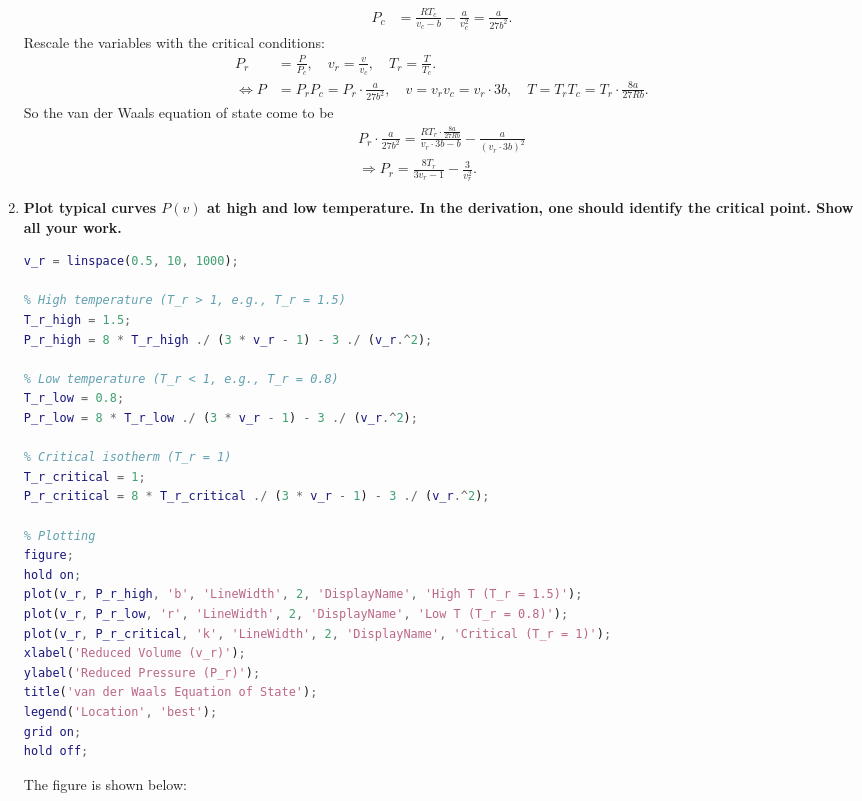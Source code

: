 \documentclass[../../main.tex]{subfiles}
\begin{document}
\begin{enumerate}
\begin{align*}
      P_{c} &= \frac{RT_{c}}{v_{c}-b} - \frac{a}{v_{c}^{2}} = \frac{a}{27b^{2}}.
    \end{align*}
    Rescale the variables with the critical conditions:
    \begin{align*}
      P_{r} &= \frac{P}{P_{c}},\quad v_{r} = \frac{v}{v_{c}},\quad T_{r} = \frac{T}{T_{c}}.\\
      \Leftrightarrow P &= P_{r}P_{c} = P_{r}\cdot\frac{a}{27b^{2}},\quad v = v_{r}v_{c} = v_{r}\cdot 3b,\quad T = T_{r}T_{c} = T_{r}\cdot\frac{8a}{27Rb}.
    \end{align*}
    So the van der Waals equation of state come to be
    \begin{align*}
      P_{r}\cdot \frac{a}{27b^{2}} = \frac{RT_{r}\cdot\frac{8a}{27Rb}}{v_{r}\cdot 3b - b} - \frac{a}{(v_{r}\cdot 3b)^{2}}\\
      \Rightarrow P_{r} = \frac{8T_{r}}{3v_{r}-1} - \frac{3}{v_{r}^{2}}.
    \end{align*}

    \item \textbf{Plot typical curves $P(v)$ at high and low temperature. In the derivation, one should identify the critical point. Show all your work.}
    \begin{lstlisting}[language=matlab]
% Define the reduced volume range
v_r = linspace(0.5, 10, 1000);

% High temperature (T_r > 1, e.g., T_r = 1.5)
T_r_high = 1.5;
P_r_high = 8 * T_r_high ./ (3 * v_r - 1) - 3 ./ (v_r.^2);

% Low temperature (T_r < 1, e.g., T_r = 0.8)
T_r_low = 0.8;
P_r_low = 8 * T_r_low ./ (3 * v_r - 1) - 3 ./ (v_r.^2);

% Critical isotherm (T_r = 1)
T_r_critical = 1;
P_r_critical = 8 * T_r_critical ./ (3 * v_r - 1) - 3 ./ (v_r.^2);

% Plotting
figure;
hold on;
plot(v_r, P_r_high, 'b', 'LineWidth', 2, 'DisplayName', 'High T (T_r = 1.5)');
plot(v_r, P_r_low, 'r', 'LineWidth', 2, 'DisplayName', 'Low T (T_r = 0.8)');
plot(v_r, P_r_critical, 'k', 'LineWidth', 2, 'DisplayName', 'Critical (T_r = 1)');
xlabel('Reduced Volume (v_r)');
ylabel('Reduced Pressure (P_r)');
title('van der Waals Equation of State');
legend('Location', 'best');
grid on;
hold off;
    \end{lstlisting}
    The figure is shown below:


\end{enumerate}
\end{document}
